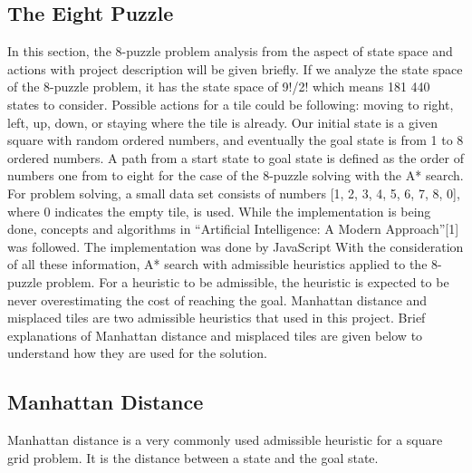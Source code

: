 \documentclass[12pt]{report}
\begin{document}
\subsection{The Eight Puzzle}
In this section, the 8-puzzle problem analysis from the
aspect of state space and actions with project description
will be given briefly.
If we analyze the state space of the 8-puzzle problem, it has
the state space of 9!/2! which means 181 440 states to
consider. Possible actions for a tile could be following:
moving to right, left, up, down, or staying where the tile is
already. Our initial state is a given square with random
ordered numbers, and eventually the goal state is from 1 to
8 ordered numbers. A path from a start state to goal state is
defined as the order of numbers one from to eight for the
case of the 8-puzzle solving with the A* search.
For problem solving, a small data set consists of numbers
[1, 2, 3, 4, 5, 6, 7, 8, 0], where 0 indicates the empty tile, is
used.
\newline While the implementation is being done, concepts and
algorithms in “Artificial Intelligence: A Modern
Approach”[1] was followed. The implementation was done
by JavaScript
\newline With the consideration of all these information, A* search
with admissible heuristics applied to the 8-puzzle problem.
For a heuristic to be admissible, the heuristic is expected to
be never overestimating the cost of reaching the goal.
Manhattan distance and misplaced tiles are two admissible
heuristics that used in this project. Brief explanations of
Manhattan distance and misplaced tiles are given below to
understand how they are used for the solution.


\subsection{Manhattan Distance}
Manhattan distance is a very commonly used admissible
heuristic for a square grid problem. It is the distance
between a state and the goal state.
\end{document}
